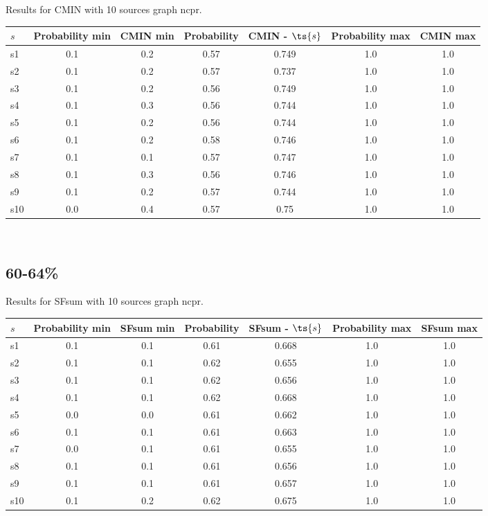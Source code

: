 \documentclass{article}
\begin{document}
\noindent Results for CMIN with 10 sources graph ncpr.

\noindent\begin{tabular}{|l|c|c|c|c|c|c|}
\hline
$s$& Probability min & CMIN min & Probability & CMIN - $\ts{s}$ & Probability max & CMIN max\\
\hline
s1 &0.1 & 0.2 & 0.57 & 0.749 & 1.0 & 1.0\\
\hline
s2 &0.1 & 0.2 & 0.57 & 0.737 & 1.0 & 1.0\\
\hline
s3 &0.1 & 0.2 & 0.56 & 0.749 & 1.0 & 1.0\\
\hline
s4 &0.1 & 0.3 & 0.56 & 0.744 & 1.0 & 1.0\\
\hline
s5 &0.1 & 0.2 & 0.56 & 0.744 & 1.0 & 1.0\\
\hline
s6 &0.1 & 0.2 & 0.58 & 0.746 & 1.0 & 1.0\\
\hline
s7 &0.1 & 0.1 & 0.57 & 0.747 & 1.0 & 1.0\\
\hline
s8 &0.1 & 0.3 & 0.56 & 0.746 & 1.0 & 1.0\\
\hline
s9 &0.1 & 0.2 & 0.57 & 0.744 & 1.0 & 1.0\\
\hline
s10 &0.0 & 0.4 & 0.57 & 0.75 & 1.0 & 1.0\\
\hline
\end{tabular}\\

\newpage

\subsection{60-64\%}

\noindent Results for SFsum with 10 sources graph ncpr.

\noindent\begin{tabular}{|l|c|c|c|c|c|c|}
\hline
$s$& Probability min & SFsum min & Probability & SFsum - $\ts{s}$ & Probability max & SFsum max\\
\hline
s1 &0.1 & 0.1 & 0.61 & 0.668 & 1.0 & 1.0\\
\hline
s2 &0.1 & 0.1 & 0.62 & 0.655 & 1.0 & 1.0\\
\hline
s3 &0.1 & 0.1 & 0.62 & 0.656 & 1.0 & 1.0\\
\hline
s4 &0.1 & 0.1 & 0.62 & 0.668 & 1.0 & 1.0\\
\hline
s5 &0.0 & 0.0 & 0.61 & 0.662 & 1.0 & 1.0\\
\hline
s6 &0.1 & 0.1 & 0.61 & 0.663 & 1.0 & 1.0\\
\hline
s7 &0.0 & 0.1 & 0.61 & 0.655 & 1.0 & 1.0\\
\hline
s8 &0.1 & 0.1 & 0.61 & 0.656 & 1.0 & 1.0\\
\hline
s9 &0.1 & 0.1 & 0.61 & 0.657 & 1.0 & 1.0\\
\hline
s10 &0.1 & 0.2 & 0.62 & 0.675 & 1.0 & 1.0\\
\hline
\end{tabular}\\
\end{document}
